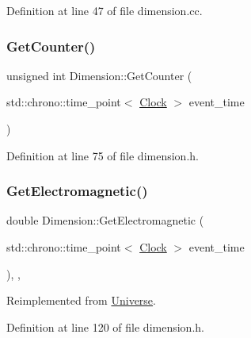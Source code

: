 Definition at line 47 of file dimension.\+cc.

\mbox{\label{class_dimension_a2fbee64eeea5de3d8eab10cf0fdb6363}} 
\subsubsection{\texorpdfstring{Get\+Counter()}{GetCounter()}}
{\footnotesize\ttfamily unsigned int Dimension\+::\+Get\+Counter (\begin{DoxyParamCaption}\item[{std\+::chrono\+::time\+\_\+point$<$ \hyperlink{universe_8h_a0ef8d951d1ca5ab3cfaf7ab4c7a6fd80}{Clock} $>$}]{event\+\_\+time }\end{DoxyParamCaption})\hspace{0.3cm}{\ttfamily [inline]}}



Definition at line 75 of file dimension.\+h.

\mbox{\label{class_dimension_a21783c29a576518b722512f1245fa598}} 
\subsubsection{\texorpdfstring{Get\+Electromagnetic()}{GetElectromagnetic()}}
{\footnotesize\ttfamily double Dimension\+::\+Get\+Electromagnetic (\begin{DoxyParamCaption}\item[{std\+::chrono\+::time\+\_\+point$<$ \hyperlink{universe_8h_a0ef8d951d1ca5ab3cfaf7ab4c7a6fd80}{Clock} $>$}]{event\+\_\+time }\end{DoxyParamCaption})\hspace{0.3cm}{\ttfamily [inline]}, {\ttfamily [final]}, {\ttfamily [virtual]}}



Reimplemented from \hyperlink{class_universe_a63b850ef3f3394313353109d222bf5d1}{Universe}.



Definition at line 120 of file dimension.\+h.

\mbox{\label{class_dimension_ae1babb1fa280c35966d7ee3de6655e4d}} 
